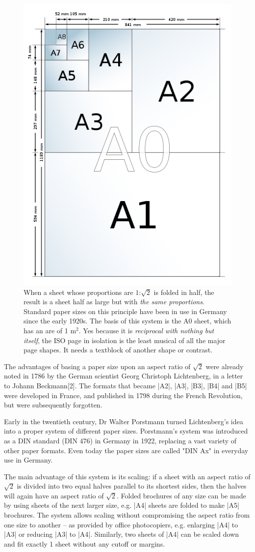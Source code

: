 \begin{figure}
  \includegraphics[width=0.5\linewidth]{./graphics/A-sizes.png}
  \caption{When a sheet whose proportions are $1$:$\surd{2}$ is folded in half, the result is a sheet half as large but with \emph{the same proportions}. Standard paper sizes on this principle have been in use in Germany since the early 1920s. The basis of this system is the A0 sheet, which has an are of 1 m$^2$. Yes because it is \textit{reciprocal with nothing but itself}, the ISO page in isolation is the least musical of all the major page shapes. It needs a textblock of another shape or contrast.}
   \label{fig:marginfig1}
\end{figure}

The advantages of basing a paper size upon an aspect ratio of $\surd{2}$ were already noted in 1786 by the German scientist Georg Christoph Lichtenberg, in a letter to Johann Beckmann[2]. The formats that became |A2|, |A3|, |B3|, |B4| and |B5| were developed in France, and published in 1798 during the French Revolution, but were subsequently forgotten. \cite{letimbre2136}

Early in the twentieth century, Dr Walter Porstmann turned Lichtenberg's idea into a proper system of different paper sizes. Porstmann's system was introduced as a DIN standard (DIN 476) in Germany in 1922, replacing a vast variety of other paper formats. Even today the paper sizes are called "DIN Ax" in everyday use in Germany.

The main advantage of this system is its scaling: if a sheet with an aspect ratio of $\surd{2}$ is divided into two equal halves parallel to its shortest sides, then the halves will again have an aspect ratio of $\surd{2}$. Folded brochures of any size can be made by using sheets of the next larger size, e.g. |A4| sheets are folded to make |A5| brochures. The system allows scaling without compromising the aspect ratio from one size to another – as provided by office photocopiers, e.g. enlarging |A4| to |A3| or reducing |A3| to |A4|. Similarly, two sheets of |A4| can be scaled down and fit exactly 1 sheet without any cutoff or margins.

